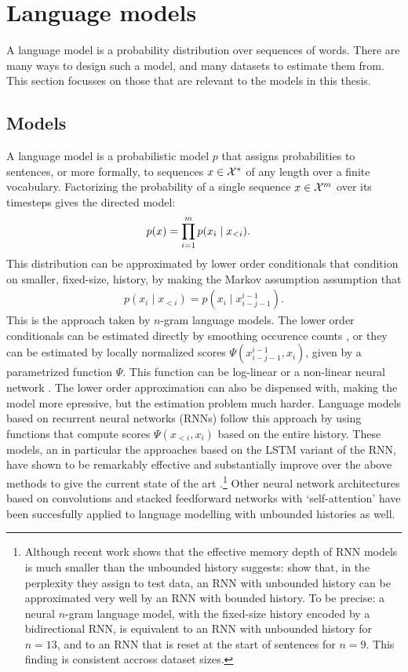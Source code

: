 \section{Language models}
  A language model is a probability distribution over sequences of words. There are many ways to design such a model, and many datasets to estimate them from. This section focusses on those that are relevant to the models in this thesis.

  \subsection{Models}
    A language model is a probabilistic model $p$ that assigns probabilities to sentences, or more formally, to sequences $x \in \mathcal{X}^{*}$ of any length over a finite vocabulary. Factorizing the probability of a single sequence $x \in \mathcal{X}^m$ over its timesteps gives the directed model:
    \begin{align}
      \label{eq:lm-factorized}
      p( x )
        &= \prod_{i=1}^m p(x_i \mid x_{<i}).
    \end{align}
    This distribution can be approximated by lower order conditionals that condition on smaller, fixed-size, history, by making the Markov assumption assumption that
    \begin{align*}
      p(x_i \mid x_{<i}) = p(x_i \mid x_{i-j-1}^{i-1}).
    \end{align*}
    This is the approach taken by $n$-gram language models. The lower order conditionals can be estimated directly by smoothing occurence counts \citep{chen1999empirical,kneser1995improved}, or they can be estimated by locally normalized scores $\Psi(x_{i-j-1}^{i-1}, x_i)$, given by a parametrized function $\Psi$. This function can be log-linear or a non-linear neural network \citep{rosenfeld1996loglinear,bengio2003neural}. The lower order approximation can also be dispensed with, making the model more epressive, but the estimation problem much harder. Language models based on recurrent neural networks (RNNs) follow this approach by using functions that compute scores $\Psi(x_{<i}, x_i)$ based on the entire history\citep{mikolov2010recurrent}. These models, an in particular the approaches based on the LSTM variant of the RNN, have shown to be remarkably effective and substantially improve over the above methods to give the current state of the art \citep{zaremba2014recurrent,jozefowicz2016exploring}.\footnote{Although recent work shows that the effective memory depth of RNN models is much smaller than the unbounded history suggests: \citet{chelba2017n} show that, in the perplexity they assign to test data, an RNN with unbounded history can be approximated very well by an RNN with bounded history. To be precise: a neural $n$-gram language model, with the fixed-size history encoded by a bidirectional RNN, is equivalent to an RNN with unbounded history for $n=13$, and to an RNN that is reset at the start of sentences for $n=9$. This finding is consistent accross dataset sizes.} Other neural network architectures based on convolutions \citep{kalchbrenner2014convolutional} and stacked feedforward networks with `self-attention' \citep{vaswani2017attention} have been succesfully applied to language modelling with unbounded histories as well.
